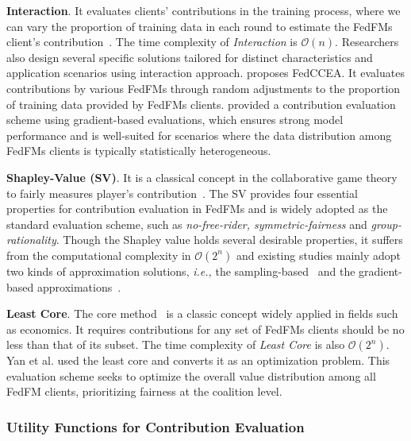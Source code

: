 \textbf{Interaction}.
It evaluates clients' contributions in the training process, where we can vary the proportion of training data in each round to estimate the FedFMs client's contribution~\cite{RN9, RN33}.
The time complexity of \textit{Interaction} is $\mathcal{O}(n)$. 
Researchers also design several specific solutions tailored for distinct characteristics and application scenarios using interaction approach.
\citet{RN9} proposes FedCCEA.
It evaluates contributions by various FedFMs through random adjustments to the proportion of training data provided by FedFMs clients.
\citet{RN33} provided a contribution evaluation scheme using gradient-based evaluations, which ensures strong model performance and is well-suited for scenarios where the data distribution among FedFMs clients is typically statistically heterogeneous.


\textbf{Shapley-Value (SV)}. It is a classical concept in the collaborative game theory to fairly measures player's contribution~\cite{Shapley1988AVF}.
The SV provides four essential properties for contribution evaluation in FedFMs and is widely adopted as the standard evaluation scheme, such as \textit{no-free-rider, symmetric-fairness} and \textit{group-rationality}.
Though the Shapley value holds several desirable properties, it suffers from the computational complexity in $\mathcal{O}(2^n)$ and existing studies mainly adopt two kinds of approximation solutions, \textit{i.e.,} the sampling-based~\cite{RN21} and the gradient-based approximations~\cite{song2019profit, wei2020efficient}.


\textbf{Least Core}.
The core method~\cite{Sch1969nucleolus} is a classic concept widely applied in fields such as economics.
It requires contributions for any set of FedFMs clients should be no less than that of its subset.
The time complexity of \textit{Least Core} is also $\mathcal{O}(2^n)$.
Yan et al. \cite{Yan2021IfYL} used the least core and converts it as an optimization problem.
This evaluation scheme seeks to optimize the overall value distribution among all FedFM clients, prioritizing fairness at the coalition level.
   
\subsubsection{Utility Functions for Contribution Evaluation} 

